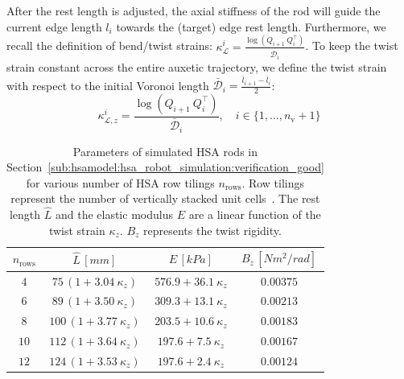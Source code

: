 After the rest length is adjusted, the axial stiffness of the rod will guide the current edge length $l_i$ towards the (target) edge rest length. %
Furthermore, we recall the definition of bend/twist strains: $\kappa_{\mathcal{L}}^i = \frac{\log(Q_{i+1} \: Q_i^\top)}{\hat{\mathcal{D}}_i}$. 
To keep the twist strain constant across the entire auxetic trajectory, we define the twist strain with respect to the initial Voronoi length $\bar{\mathcal{D}}_i = \frac{\bar{l}_{i+1} - \bar{l}_i}{2}$:
\begin{equation}
    \kappa_{\mathcal{L},z}^i = \frac{\log(Q_{i+1} \: Q_i^\top)}{\bar{\mathcal{D}}_i}, \quad i\in \{1,\dots,n_\mathrm{v}+1\}
\end{equation}

\begin{table}[hbt]
\centering
\caption{Parameters of simulated HSA rods in Section~\ref{sub:hsamodel:hsa_robot_simulation:verification_good} for various number of HSA row tilings $n_\mathrm{rows}$. Row tilings represent the number of vertically stacked unit cells~\citep{good2022expanding}. The rest length $\hat{L}$ and the elastic modulus $E$ are a linear function of the twist strain $\kappa_z$. $B_z$ represents the twist rigidity.}
\begin{tabular}{c ccc}\toprule
$n_\mathrm{rows}$ & $\hat{L} \, [\si{mm}]$ & $E \, [\si{kPa}]$ & $B_z \, [\si{Nm^2 \per rad}]$\\
\midrule
$4$ & $75 \, (1 + 3.04 \: \kappa_z)$ & $576.9 + 36.1 \: \kappa_z$ & $0.00375$\\
$6$ & $89 \, (1 + 3.50 \: \kappa_z)$ & $309.3 + 13.1 \: \kappa_z$ & $0.00213$\\
$8$ & $100 \, (1 + 3.77 \: \kappa_z)$ & $203.5 + 10.6 \: \kappa_z$ & $0.00183$\\
$10$ & $112 \, (1 + 3.64 \: \kappa_z)$ & $197.6 + 7.5 \: \kappa_z$ & $0.00167$\\
$12$ & $124 \, (1 + 3.53 \: \kappa_z)$ & $197.6 + 2.4 \: \kappa_z$ & $0.00124$\\
\bottomrule
\end{tabular}
\label{tab:hsamodel:hsa_rod_parameters_sim_verification}
\end{table}

